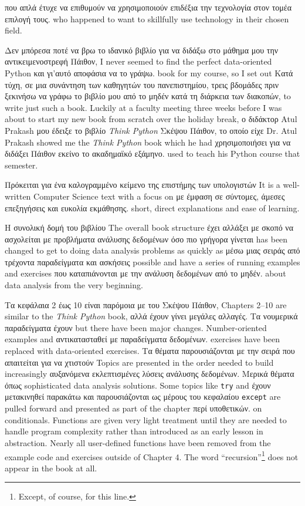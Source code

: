 που απλά έτυχε να επιθυμούν να χρησιμοποιούν επιδέξια την τεχνολογία στον τομέα επιλογή τους.
who happened to want to skillfully use technology in their chosen field.

Δεν μπόρεσα ποτέ να βρω το ιδανικό βιβλίο για να διδάξω στο μάθημα μου την αντικειμενοστρεφή Πάιθον,
I never seemed to find the perfect data-oriented Python
και γι'αυτό αποφάσια να το γράψω.
book for my course, so I set out 
Κατά τύχη, σε μια συνάντηση των καθηγητών του πανεπιστημίου, τρεις βδομάδες πριν ξεκινήσω να γράφω το βιβλίο μου από το μηδέν κατά τη διάρκεια των διακοπών, 
to write just such a book.  Luckily at a faculty meeting three weeks
before I was about to start my new book from scratch over 
the holiday break, 
ο διδάκτορ Atul Prakash μου έδειξε το βιβλίο \emph{Think Python} Σκέψου Πάιθον, το οποίο είχε   
Dr. Atul Prakash showed me the \emph{Think Python} book which he had
χρησιμοποιήσει για να διδάξει Πάιθον εκείνο το ακαδημαϊκό εξάμηνο.
used to teach his Python course that semester.  

Πρόκειται για ένα καλογραμμένο κείμενο της επιστήμης των υπολογιστών 
It is a well-written Computer Science text with a focus on 
με έμφαση σε σύντομες, άμεσες επεξηγήσεις και ευκολία εκμάθησης.
short, direct explanations and ease of learning.  

Η συνολική δομή του βιβλίου
The overall book structure
έχει αλλάξει με σκοπό να ασχολείται με προβλήματα ανάλυσης δεδομένων όσο πιο γρήγορα γίνεται
has been changed to get to doing data analysis problems as quickly as
μέσω μιας σειράς από τρέχοντα παραδείγματα και ασκήσεις
possible and have a series of running examples and exercises 
που καταπιάνονται με την ανάλυση δεδομένων από το μηδέν.
about data analysis from the very beginning.  

Τα κεφάλαια 2 έως 10 είναι παρόμοια με του Σκέψου Πάιθον,
Chapters 2--10 are similar to the \emph{Think Python} book,
αλλά έχουν γίνει μεγάλες αλλαγές. Τα νουμερικά παραδείγματα έχουν 
but there have been major changes. Number-oriented examples and
αντικατασταθεί με παραδείγματα δεδομένων. 
exercises have been replaced with data-oriented exercises.
Τα θέματα παρουσιάζονται με την σειρά που απαιτείται για να χτιστούν 
Topics are presented in the order needed to build increasingly
αυξανόμενα εκλεπτισμένες λύσεις ανάλυσης δεδομένων. Μερικά θέματα όπως 
sophisticated data analysis solutions. Some topics like {\tt try} and
έχουν μετακινηθεί παρακάτω και παρουσιάζονται ως μέρους του κεφαλαίου 
{\tt except} are pulled forward and presented as part of the chapter
περί υποθετικών. 
on conditionals.  Functions are given very light treatment until 
they are needed to handle program complexity rather than introduced 
as an early lesson in abstraction.  Nearly all user-defined functions
have been removed from the example code and exercises outside of Chapter 4.
The word ``recursion''\footnote{Except, of course, for this line.}
does not appear in the book at all.

